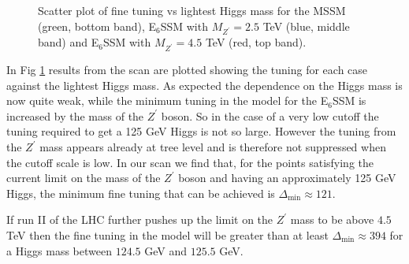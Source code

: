 \documentclass[preprint,amsmath,amssymb,aps,superscriptaddress,prd,showpacs,floatfix,nofootinbib]{revtex4-1}
\begin{document}
\begin{figure}[h]
\begin{center}
\caption{Scatter plot of fine tuning vs lightest Higgs mass for the
  MSSM (green, bottom band), E$_6$SSM with $M_{Z^\prime} = 2.5$ TeV (blue, middle band) and
  E$_6$SSM with $M_{Z^\prime} = 4.5$ TeV (red, top band).}
\label{Fig:e6ssmvsmssm}
\end{center}
\end{figure}
In Fig \ref{Fig:e6ssmvsmssm} results from the scan are plotted showing
the tuning for each case against the lightest Higgs mass.  As expected
the dependence on the Higgs mass is now quite weak, while the minimum
tuning in the model for the E$_6$SSM is increased by the mass of the
$Z^\prime$ boson.  So in the case of a very low cutoff the tuning
required to get a 125 GeV Higgs is not so large.  However the tuning
from the $Z^\prime$ mass appears already at tree level and is
therefore not suppressed when the cutoff scale is low. In our scan we find that, for the points satisfying the current limit on the mass of the $Z^\prime$ boson and having an approximately 125 GeV Higgs, the minimum fine tuning that can be achieved is 
$\Delta_{\textrm{min}}\approx 121$.

If run II of the LHC further pushes up the limit on the $Z^\prime$
mass to be above $4.5$ TeV then the fine tuning in the model will be
greater than at least $\Delta_{\textrm{min}}\approx 394$ for a Higgs mass between $124.5$ GeV and $125.5$ GeV.
\end{document}
